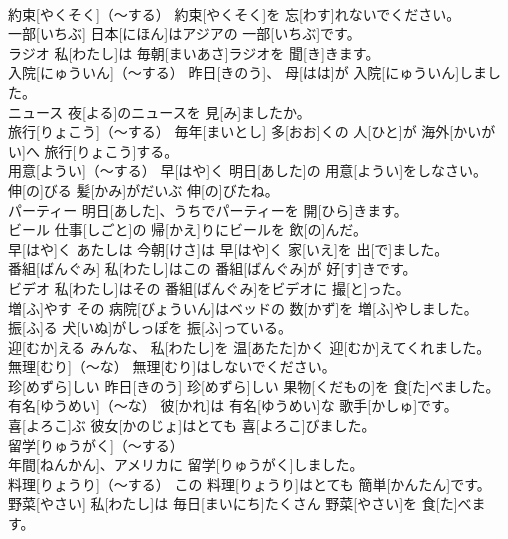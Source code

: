 \documentclass[8pt]{extreport}
\begin{document}
\begin{CJK}{UTF8}{min}
\\	約束[やくそく]（～する）	約束[やくそく]を 忘[わす]れないでください。		
\\	一部[いちぶ]	日本[にほん]はアジアの 一部[いちぶ]です。		
\\	ラジオ	私[わたし]は 毎朝[まいあさ]ラジオを 聞[き]きます。		
\\	入院[にゅういん]（～する）	昨日[きのう]、 母[はは]が 入院[にゅういん]しました。		
\\	ニュース	夜[よる]のニュースを 見[み]ましたか。		
\\	旅行[りょこう]（～する）	毎年[まいとし] 多[おお]くの 人[ひと]が 海外[かいがい]へ 旅行[りょこう]する。		
\\	用意[ようい]（～する）	早[はや]く 明日[あした]の 用意[ようい]をしなさい。		
\\	伸[の]びる	髪[かみ]がだいぶ 伸[の]びたね。		
\\	パーティー	明日[あした]、うちでパーティーを 開[ひら]きます。		
\\	ビール	仕事[しごと]の 帰[かえ]りにビールを 飲[の]んだ。		
\\	早[はや]く	あたしは 今朝[けさ]は 早[はや]く 家[いえ]を 出[で]ました。		
\\	番組[ばんぐみ]	私[わたし]はこの 番組[ばんぐみ]が 好[す]きです。		
\\	ビデオ	私[わたし]はその 番組[ばんぐみ]をビデオに 撮[と]った。		
\\	増[ふ]やす	その 病院[びょういん]はベッドの 数[かず]を 増[ふ]やしました。		
\\	振[ふ]る	犬[いぬ]がしっぽを 振[ふ]っている。		
\\	迎[むか]える	みんな、 私[わたし]を 温[あたた]かく 迎[むか]えてくれました。		
\\	無理[むり]（～な）	無理[むり]はしないでください。		
\\	珍[めずら]しい	昨日[きのう] 珍[めずら]しい 果物[くだもの]を 食[た]べました。		
\\	有名[ゆうめい]（～な）	彼[かれ]は 有名[ゆうめい]な 歌手[かしゅ]です。		
\\	喜[よろこ]ぶ	彼女[かのじょ]はとても 喜[よろこ]びました。		
\\	留学[りゅうがく]（～する）	
\\	年間[ねんかん]、アメリカに 留学[りゅうがく]しました。		
\\	料理[りょうり]（～する）	この 料理[りょうり]はとても 簡単[かんたん]です。		
\\	野菜[やさい]	私[わたし]は 毎日[まいにち]たくさん 野菜[やさい]を 食[た]べます。		

\end{CJK}
\end{document}
